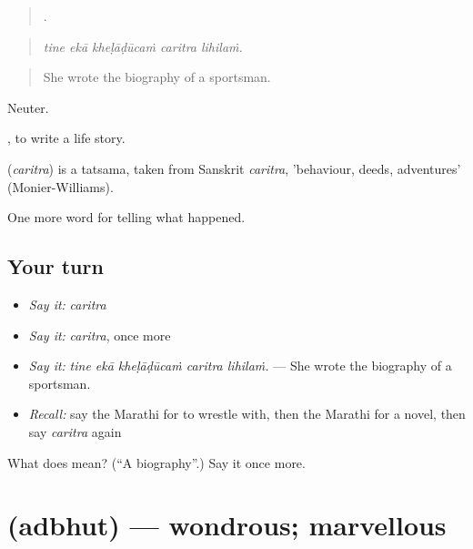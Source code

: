 \begin{quote}
    .
\end{quote}

\begin{quote}
\emph{tine ekā kheḷāḍūcaṁ caritra lihilaṁ.}
\end{quote}

\begin{quote}
She wrote the biography of a sportsman.
\end{quote}

Neuter.

 , to write a life story.

\begin{cousinweb}
\textbf{} (\emph{caritra}) is a tatsama, taken from Sanskrit \emph{caritra}, 'behaviour, deeds, adventures' (Monier-Williams).
\end{cousinweb}

\begin{grammarlens}[title={What you've built}]
One more word for telling what happened.
\end{grammarlens}

\subsection*{Your turn}
\begin{itemize}
\raggedright
  \item \emph{Say it:} \emph{caritra}
  \item \emph{Say it:} \emph{caritra}, once more
  \item \emph{Say it:} \emph{tine ekā kheḷāḍūcaṁ caritra lihilaṁ.} — She wrote the biography of a sportsman.
  \item \emph{Recall:} say the Marathi for to wrestle with, then the Marathi for a novel, then say \emph{caritra} again
\end{itemize}

\begin{tcolorbox}[breakable,colback=teal!4,colframe=teal!35!black,title={Before you move on}]
What does  mean? (\textquotedblleft{}A biography\textquotedblright{}.) Say it once more.
\end{tcolorbox}
\section[\texorpdfstring{\mr{अद्भुत} (adbhut)}{अद्भुत (adbhut)}]{ (adbhut) — wondrous; marvellous}

